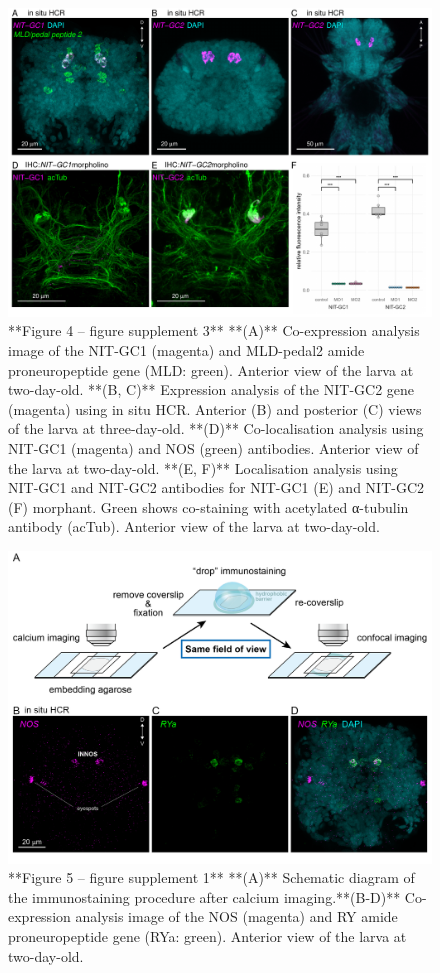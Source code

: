 \documentclass[
  10pt,
  onecolumn]{article}
\begin{document}
\begin{figure}
\includegraphics[width=33.33in]{figures/Fig4_sup3} \caption{**Figure 4 -- figure supplement 3** **(A)** Co-expression analysis image of the NIT-GC1 (magenta) and MLD-pedal2 amide proneuropeptide gene (MLD: green). Anterior view of the larva at two-day-old. **(B, C)** Expression analysis of the NIT-GC2 gene (magenta) using in situ HCR. Anterior (B) and posterior (C) views of the larva at three-day-old. **(D)** Co-localisation analysis using NIT-GC1 (magenta) and NOS (green) antibodies. Anterior view of the larva at two-day-old. **(E, F)** Localisation analysis using NIT-GC1 and NIT-GC2 antibodies for NIT-GC1 (E) and NIT-GC2 (F) morphant. Green shows co-staining with acetylated α-tubulin antibody (acTub). Anterior view of the larva at two-day-old.}\label{fig:unnamed-chunk-14}
\end{figure}

\begin{figure}
\includegraphics[width=27.78in]{figures/Fig5_sup1} \caption{**Figure 5 -- figure supplement 1** **(A)** Schematic diagram of the immunostaining procedure after calcium imaging.**(B-D)** Co-expression analysis image of the NOS (magenta) and RY amide proneuropeptide gene (RYa: green). Anterior view of the larva at two-day-old. }\label{fig:unnamed-chunk-15}
\end{figure}
\end{document}
